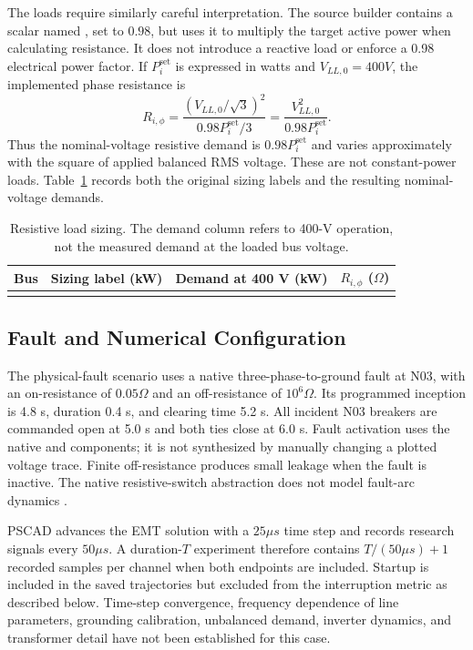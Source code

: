 The loads require similarly careful interpretation. The source builder
contains a scalar named , set to $0.98$, but uses it to multiply
the target active power when calculating resistance. It does not introduce a
reactive load or enforce a 0.98 electrical power factor. If $P_i^{\mathrm{set}}$
is expressed in watts and $V_{LL,0}=400\unit{V}$, the implemented phase
resistance is
\begin{equation}
 R_{i,\phi}=
 \frac{(V_{LL,0}/\sqrt{3})^2}{0.98 P_i^{\mathrm{set}}/3}
 =\frac{V_{LL,0}^{2}}{0.98 P_i^{\mathrm{set}}}.
\label{eq:load}
\end{equation}
Thus the nominal-voltage resistive demand is $0.98P_i^{\mathrm{set}}$ and
varies approximately with the square of applied balanced RMS voltage. These
are not constant-power loads. Table~\ref{tab:loads} records both the original
sizing labels and the resulting nominal-voltage demands.

\begin{table}[tb]
\centering\small
\caption{Resistive load sizing. The demand column refers to 400-V operation,
not the measured demand at the loaded bus voltage.}
\label{tab:loads}
\begin{tabular}{@{}lrrr@{}}
\toprule
Bus & Sizing label (kW) & Demand at 400 V (kW) & $R_{i,\phi}$ ($\Omega$) \\
\midrule
\\
\bottomrule
\end{tabular}
\end{table}

\subsection{Fault and Numerical Configuration}
The physical-fault scenario uses a native three-phase-to-ground fault at N03,
with an on-resistance of $0.05\unit{\Omega}$ and an off-resistance of
$10^6\unit{\Omega}$. Its programmed inception is 4.8 s, duration 0.4 s,
and clearing time 5.2 s. All incident N03 breakers are commanded open at
5.0 s and both ties close at 6.0 s. Fault activation uses the native
 and  components; it is not synthesized by manually
changing a plotted voltage trace. Finite off-resistance produces small leakage
when the fault is inactive. The native resistive-switch abstraction does not
model fault-arc dynamics \cite{pscadFaults}.

PSCAD advances the EMT solution with a $25\unit{\mu s}$ time step and records
research signals every $50\unit{\mu s}$. A duration-$T$ experiment therefore
contains $T/(50\unit{\mu s})+1$ recorded samples per channel when both endpoints
are included. Startup is included in the saved trajectories but excluded from
the interruption metric as described below. Time-step convergence, frequency
dependence of line parameters, grounding calibration, unbalanced demand,
inverter dynamics, and transformer detail have not been established for this
case.

